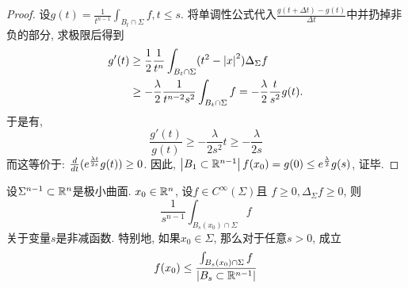 \begin{proof}
    设$g(t)=\frac{1}{t^{n-1}}\int_{B_t\cap \Sigma}f, t\le s$.  将单调性公式代入$\frac{g(t+\Delta t)-g(t)}{\Delta t}$中并扔掉非负的部分, 求极限后得到
    \begin{equation}
        \begin{split}
            g'(t) &\ge \frac{1}{2}\frac{1}{t^n}\int_{B_t\cap \Sigma}(t^2-\left | x \right |^2)\Delta_\Sigma f \\
            &\ge -\frac{\lambda}{2}\frac{1}{t^{n-2}s^2}\int_{B_t\cap \Sigma}f = -\frac{\lambda}{2}\frac{t}{s^2}g(t).
        \end{split}
    \end{equation}
    于是有,
    \begin{equation}
        \frac{g'(t)}{g(t)} \ge - \frac{\lambda}{2s^2}t\ge -\frac{\lambda}{2s}
    \end{equation}
    而这等价于: $\frac{d}{dt} (e^{\frac{\lambda t}{2s}}g(t)) \ge 0$. 因此, $\left | B_1 \subset \mathbb{R}^{n-1} \right |f(x_0)=g(0) \le e^{\frac{\lambda}{2}}g(s)$, 证毕.
\end{proof}
\begin{corollary}
    设$\Sigma^{n-1} \subset \mathbb{R}^n$是极小曲面. $x_0 \in \mathbb{R}^n$, 设$f \in C^\infty(\Sigma)$且 $f \ge 0, \Delta_{\Sigma}f \ge 0$, 则
    \begin{equation}
        \frac{1}{s^{n-1}} \int_{B_s(x_0)\cap \Sigma}f
    \end{equation}
    关于变量$s$是非减函数. 特别地, 如果$x_0 \in \Sigma$, 那么对于任意$s>0$, 成立
    \begin{equation}
        f(x_0) \le \frac{\int_{B_s(x_0)\cap \Sigma} f}{ \left | B_s\subset \mathbb{R}^{n-1} \right |}
    \end{equation}
\end{corollary}
